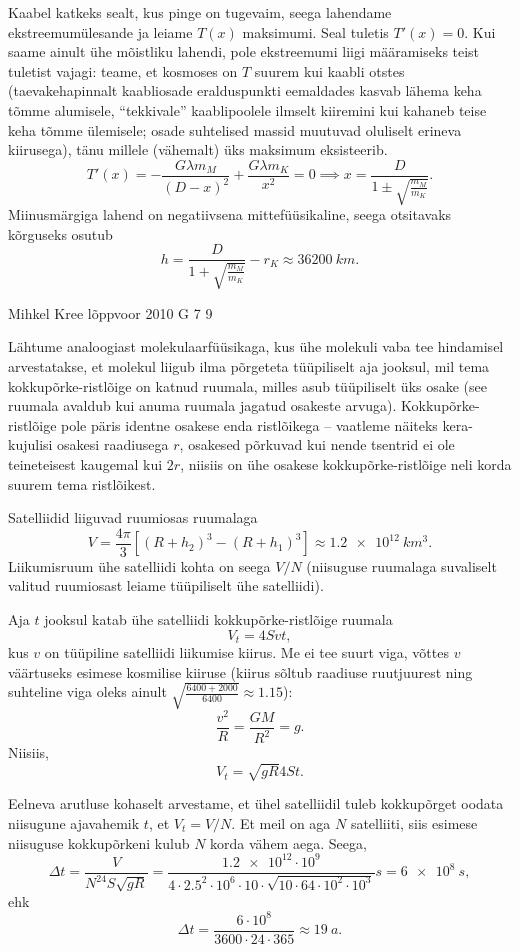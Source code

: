 \documentclass[11pt]{article}
\begin{document}
{{Kaabel katkeks sealt, kus pinge on tugevaim, seega lahendame
ekst\-ree\-mum\-üles\-an\-de
ja leiame $T(x)$ maksimumi. Seal tuletis $T'(x)=0$. Kui saame ainult ühe mõistliku lahendi, pole
ekstreemumi liigi määramiseks teist tuletist vajagi: teame, et kosmoses on $T$
suurem kui kaabli otstes (taevakehapinnalt kaabliosade eralduspunkti
eemaldades kasvab lähema keha tõmme alumisele, \enquote{tekkivale} kaablipoolele ilmselt kiiremini
kui kahaneb teise keha tõmme ülemisele; osade suhtelised massid muutuvad
oluliselt erineva kiirusega), tänu millele (vähemalt) üks maksimum eksisteerib.
\[ 
T'(x) = - \frac{ G\lambda m_M }{ (D-x)^2 } + \frac{ G\lambda m_K }{ x^2 } = 0
\implies x = \frac{D}{1 \pm \sqrt{\frac{m_M}{m_K}}}.
\]
Miinusmärgiga lahend on negatiivsena mittefüüsikaline, seega otsitavaks
kõr\-gu\-seks osutub
\[ 
h = \frac{D}{1 + \sqrt{\frac{m_M}{m_K}}} - r_K \approx
\SI{36200}{km}.
\]
\fi
}

{Mihkel Kree} %
{lõppvoor} %
{2010} %
{G 7} %
{9} %
{

\ifSolution
Lähtume analoogiast molekulaarfüüsikaga, kus ühe molekuli vaba tee hindamisel arvestatakse, et molekul liigub ilma põrgeteta tüüpiliselt aja jooksul, mil tema kokkupõrke-ristlõige on katnud ruumala, milles asub tüüpiliselt üks osake (see ruumala avaldub kui anuma ruumala jagatud osakeste arvuga). Kokkupõrke-ristlõige pole päris identne osakese enda ristlõikega -- vaatleme näiteks kera-kujulisi osakesi raadiusega $r$, osakesed põrkuvad kui nende tsentrid ei ole teineteisest kaugemal kui $2r$, niisiis on ühe osakese kokkupõrke-ristlõige neli korda suurem tema ristlõikest.

Satelliidid liiguvad ruumiosas ruumalaga
\[ V=\frac{4\pi}{3}\left[(R+h_2)^3-(R+h_1)^3\right]\approx \SI{1.2e12}{km^3}.\]
Liikumisruum ühe satelliidi kohta on seega $V/N$ (niisuguse ruumalaga suvaliselt valitud ruumiosast leiame tüüpiliselt ühe satelliidi).

Aja $t$ jooksul katab ühe satelliidi kokkupõrke-ristlõige ruumala
\[V_t=4Svt,\]
kus $v$ on tüüpiline satelliidi liikumise kiirus. Me ei tee suurt viga, võttes $v$ väärtuseks esimese kosmilise kiiruse (kiirus sõltub raadiuse ruutjuurest ning suhteline viga oleks ainult \mbox{$\sqrt{\frac{6400+2000}{6400}}\approx\num{1.15}$}):
\[\frac{v^2}{R}=\frac{GM}{R^2}=g.\]
Niisiis,
\[V_t=\sqrt{gR}4St.\]

Eelneva arutluse kohaselt arvestame, et ühel satelliidil tuleb kokkupõrget oodata niisugune ajavahemik $t$, et $V_t=V/N$. Et meil on aga $N$ satelliiti, siis esimese niisuguse kokkupõrkeni kulub $N$ korda vähem aega. Seega,
\[
\Delta t=\frac{V}{N^24S\sqrt{gR}}=\frac{\num{1.2e12}\cdot 10^9}{\num{4}\cdot\num{2.5}^2\cdot 10^6\cdot \num{10}\cdot \sqrt{10 \cdot \num{64} \cdot 10^2\cdot 10^3}}s=\SI{6e8}{s},
\]
ehk
\[
\Delta t=\frac{6\cdot10^{8}}{3600\cdot24\cdot365}\approx \SI{19}{a}.
\]
\fi
}

}
\end{document}
